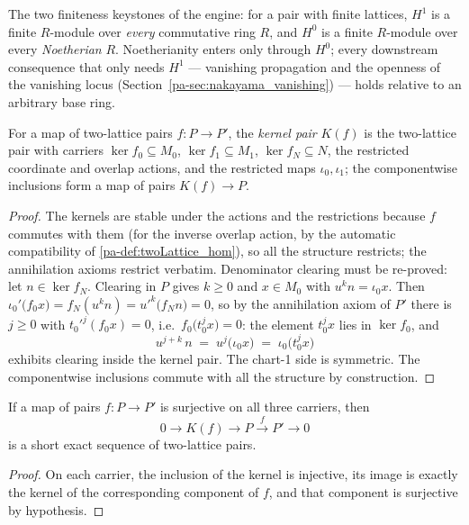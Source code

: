 The two finiteness keystones of the engine: for a pair with finite lattices, \(H^1\) is
a finite \(R\)-module over \emph{every} commutative ring \(R\), and \(H^0\) is a finite
\(R\)-module over every \emph{Noetherian} \(R\). Noetherianity enters only through
\(H^0\); every downstream consequence that only needs \(H^1\) --- vanishing propagation
and the openness of the vanishing locus (Section~\ref{pa-sec:nakayama_vanishing}) --- holds
relative to an arbitrary base ring.

\begin{definition}
  \label{pa-def:twoLattice_kernelPair}
  \leanok

  For a map of two-lattice pairs \(f : P \to P'\), the \emph{kernel pair} \(K(f)\) is
  the two-lattice pair with carriers \(\ker f_0 \subseteq M_0\),
  \(\ker f_1 \subseteq M_1\), \(\ker f_N \subseteq N\), the restricted coordinate and
  overlap actions, and the restricted maps \(\iota_0, \iota_1\); the componentwise
  inclusions form a map of pairs \(K(f) \to P\).
\end{definition}
\begin{proof}
  \leanok
  The kernels are stable under the actions and the restrictions because \(f\) commutes
  with them (for the inverse overlap action, by the automatic compatibility of
  \ref{pa-def:twoLattice_hom}), so all the structure restricts; the annihilation axioms
  restrict verbatim. Denominator clearing must be re-proved: let
  \(n \in \ker f_N\). Clearing in \(P\) gives \(k \ge 0\) and \(x \in M_0\) with
  \(u^k n = \iota_0 x\). Then
  \(\iota_0'\bigl(f_0 x\bigr) = f_N(u^k n) = u'^k\bigl(f_N n\bigr) = 0\), so by the
  annihilation axiom of \(P'\) there is \(j \ge 0\) with \(t_0'^j (f_0 x) = 0\), i.e.\
  \(f_0\bigl(t_0^j x\bigr) = 0\): the element \(t_0^j x\) lies in \(\ker f_0\), and
  \[
    u^{j + k}\, n \;=\; u^j\bigl(\iota_0 x\bigr) \;=\; \iota_0\bigl(t_0^j x\bigr)
  \]
  exhibits clearing inside the kernel pair. The chart-1 side is symmetric. The
  componentwise inclusions commute with all the structure by construction.
\end{proof}

\begin{lemma}
  \label{pa-lem:twoLattice_kernelPair_shortExact}
  \leanok

  If a map of pairs \(f : P \to P'\) is surjective on all three carriers, then
  \[
    0 \longrightarrow K(f) \longrightarrow P \xrightarrow{\ f\ } P' \longrightarrow 0
  \]
  is a short exact sequence of two-lattice pairs.
\end{lemma}
\begin{proof}
  \leanok
  On each carrier, the inclusion of the kernel is injective, its image is exactly the
  kernel of the corresponding component of \(f\), and that component is surjective by
  hypothesis.
\end{proof}

